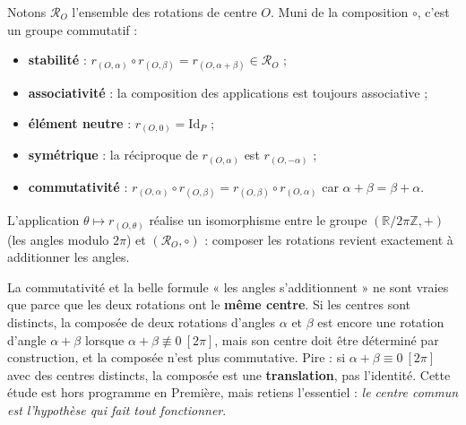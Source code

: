 \documentclass[11pt]{article}
\newcommand{\cle}[1]{{\popxbold\color{popdark}#1}}
\begin{document}
\begin{propriete}
Notons $\mathcal{R}_O$ l'ensemble des rotations de centre $O$. Muni de la composition $\circ$, c'est un \cle{groupe commutatif} :
\begin{itemize}
\item \textbf{stabilité} : $r_{(O,\alpha)} \circ r_{(O,\beta)} = r_{(O,\alpha+\beta)} \in \mathcal{R}_O$ ;
\item \textbf{associativité} : la composition des applications est toujours associative ;
\item \textbf{élément neutre} : $r_{(O,0)} = \mathrm{Id}_P$ ;
\item \textbf{symétrique} : la réciproque de $r_{(O,\alpha)}$ est $r_{(O,-\alpha)}$ ;
\item \textbf{commutativité} : $r_{(O,\alpha)} \circ r_{(O,\beta)} = r_{(O,\beta)} \circ r_{(O,\alpha)}$ car $\alpha+\beta = \beta+\alpha$.
\end{itemize}
L'application $\theta \mapsto r_{(O,\theta)}$ réalise un \cle{isomorphisme} entre le groupe $(\mathbb{R}/2\pi\mathbb{Z},+)$ (les angles modulo $2\pi$) et $(\mathcal{R}_O,\circ)$ : composer les rotations revient exactement à additionner les angles.
\end{propriete}

\begin{attention}
La commutativité et la belle formule « les angles s'additionnent » ne sont vraies que parce que les deux rotations ont le \textbf{même centre}. Si les centres sont distincts, la composée de deux rotations d'angles $\alpha$ et $\beta$ est encore une rotation d'angle $\alpha+\beta$ lorsque $\alpha+\beta \not\equiv 0 \ [2\pi]$, mais son centre doit être déterminé par construction, et la composée n'est plus commutative. Pire : si $\alpha+\beta \equiv 0 \ [2\pi]$ avec des centres distincts, la composée est une \textbf{translation}, pas l'identité. Cette étude est hors programme en Première, mais retiens l'essentiel : \emph{le centre commun est l'hypothèse qui fait tout fonctionner}.
\end{attention}
\end{document}
